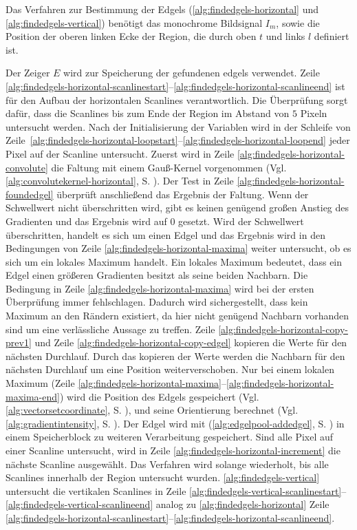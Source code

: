 Das Verfahren zur Bestimmung der Edgels (\autoref{alg:findedgels-horizontal} und \autoref{alg:findedgels-vertical})
 benötigt das monochrome Bildsignal $I_m$, sowie die Position der oberen linken Ecke der Region, die durch oben $t$ und
 links $l$ definiert ist.

Der Zeiger $E$ wird zur Speicherung der gefundenen \glspl{edgel} verwendet. Zeile
 \ref{alg:findedgels-horizontal-scanlinestart}--\ref{alg:findedgels-horizontal-scanlineend} ist für den Aufbau der
 horizontalen Scanlines verantwortlich. Die Überprüfung sorgt dafür, dass die Scanlines bis zum Ende der Region im
 Abstand von $5$ Pixeln untersucht werden. Nach der Initialisierung der Variablen wird in der Schleife von
 Zeile~\ref{alg:findedgels-horizontal-loopstart}--\ref{alg:findedgels-horizontal-loopend} jeder Pixel auf der Scanline
 untersucht. Zuerst wird in Zeile \ref{alg:findedgels-horizontal-convolute} die Faltung mit einem Gauß-Kernel
 vorgenommen (Vgl. \autoref{alg:convolutekernel-horizontal}, S. \pageref{alg:convolutekernel-horizontal}). Der Test
 in Zeile \ref{alg:findedgels-horizontal-foundedgel} überprüft anschließend das Ergebnis der Faltung. Wenn der
 Schwellwert nicht überschritten wird, gibt es keinen genügend großen Anstieg des Gradienten und das Ergebnis wird auf
 $0$ gesetzt. Wird der Schwellwert überschritten, handelt es sich um einen Edgel und das Ergebnis wird in den
 Bedingungen von Zeile \ref{alg:findedgels-horizontal-maxima} weiter untersucht, ob es sich um ein lokales Maximum
 handelt. Ein lokales Maximum bedeutet, dass ein Edgel einen größeren Gradienten besitzt als seine beiden Nachbarn. Die
 Bedingung in Zeile \ref{alg:findedgels-horizontal-maxima} wird bei der ersten Überprüfung immer fehlschlagen.
 Dadurch wird sichergestellt, dass kein Maximum an den Rändern existiert, da hier nicht genügend Nachbarn vorhanden sind
 um eine verlässliche Aussage zu treffen. Zeile \ref{alg:findedgels-horizontal-copy-prev1} und
 Zeile \ref{alg:findedgels-horizontal-copy-edgel} kopieren die Werte für den nächsten Durchlauf. Durch das kopieren der
 Werte werden die Nachbarn für den nächsten Durchlauf um eine Position weiterverschoben. Nur bei einem lokalen Maximum
 (Zeile \ref{alg:findedgels-horizontal-maxima}--\ref{alg:findedgels-horizontal-maxima-end}) wird die Position des
 Edgels gespeichert (Vgl. \autoref{alg:vectorsetcoordinate}, S. \pageref{alg:vectorsetcoordinate}), und seine
 Orientierung berechnet (Vgl. \autoref{alg:gradientintensity}, S. \pageref{alg:gradientintensity}). Der Edgel wird mit
  (\autoref{alg:edgelpool-addedgel}, S. \pageref{alg:edgelpool-addedgel}) in einem Speicherblock zu
 weiteren Verarbeitung gespeichert. Sind alle Pixel auf einer Scanline untersucht, wird in Zeile
 \ref{alg:findedgels-horizontal-increment} die nächste Scanline ausgewählt. Das Verfahren wird solange wiederholt, bis
 alle Scanlines innerhalb der Region untersucht wurden. \autoref{alg:findedgels-vertical} untersucht die vertikalen
 Scanlines in Zeile \ref{alg:findedgels-vertical-scanlinestart}--\ref{alg:findedgels-vertical-scanlineend} analog zu
 \autoref{alg:findedgels-horizontal} Zeile
 \ref{alg:findedgels-horizontal-scanlinestart}--\ref{alg:findedgels-horizontal-scanlineend}.


